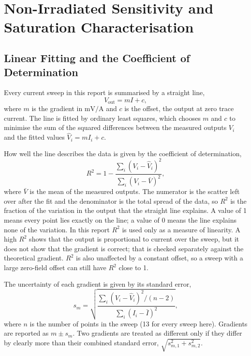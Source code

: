 \documentclass[12pt,a4paper]{article}
\begin{document}
\section{Non-Irradiated Sensitivity and Saturation Characterisation}
\label{sec:nonirr-characterisation}

\subsection{Linear Fitting and the Coefficient of Determination}
\label{sec:fitting}
 
Every current sweep in this report is summarised by a straight line,
\begin{equation}
V_{\text{out}} = m I + c,
\label{eq:linfit}
\end{equation}
where $m$ is the gradient in $\si{\milli\volt\per\ampere}$ and $c$ is the offset, the output at zero trace current. The line is fitted by ordinary least squares, which chooses $m$ and $c$ to minimise the sum of the squared differences between the measured outputs $V_i$ and the fitted values $\hat{V}_i = m I_i + c$.
 
How well the line describes the data is given by the coefficient of determination,
\begin{equation}
R^2 = 1 - \frac{\sum_i (V_i - \hat{V}_i)^2}{\sum_i (V_i - \bar{V})^2},
\label{eq:r2}
\end{equation}
where $\bar{V}$ is the mean of the measured outputs. The numerator is the scatter left over after the fit and the denominator is the total spread of the data, so $R^2$ is the fraction of the variation in the output that the straight line explains. A value of 1 means every point lies exactly on the line; a value of 0 means the line explains none of the variation. In this report $R^2$ is used only as a measure of linearity. A high $R^2$ shows that the output is proportional to current over the sweep, but it does not show that the gradient is correct; that is checked separately against the theoretical gradient. $R^2$ is also unaffected by a constant offset, so a sweep with a large zero-field offset can still have $R^2$ close to 1.
 
The uncertainty of each gradient is given by its standard error,
\begin{equation}
s_m = \sqrt{\frac{\sum_i (V_i - \hat{V}_i)^2 / (n-2)}{\sum_i (I_i - \bar{I})^2}},
\label{eq:slope-se}
\end{equation}
where $n$ is the number of points in the sweep (13 for every sweep here). Gradients are reported as $m \pm s_m$. Two gradients are treated as different only if they differ by clearly more than their combined standard error, $\sqrt{s_{m,1}^2 + s_{m,2}^2}$.
\end{document}
